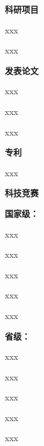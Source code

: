 \begin{achievement}
    {%
        \noindent \heiti {} \textbf{科研项目} 
        
        \noindent [1] xxx

        \noindent [2] xxx
        
        \noindent \heiti {} \textbf{发表论文}
        
        \noindent [1] xxx

        \noindent [2] xxx

        \noindent [3] xxx

        \noindent \heiti {} \textbf{专利}

        \noindent [1] xxx

        \noindent \heiti {} \textbf{科技竞赛}

        \noindent \heiti {} \textbf{国家级：}

        \noindent [1] xxx

        \noindent [2] xxx

        \noindent [3] xxx

        \noindent [4] xxx

        \noindent [5] xxx
        
        \noindent \heiti {} \textbf{省级：}

        \noindent [1] xxx

        \noindent [2] xxx

        \noindent [3] xxx

        \noindent [4] xxx

        \noindent [5] xxx

    }
    \end{achievement}

